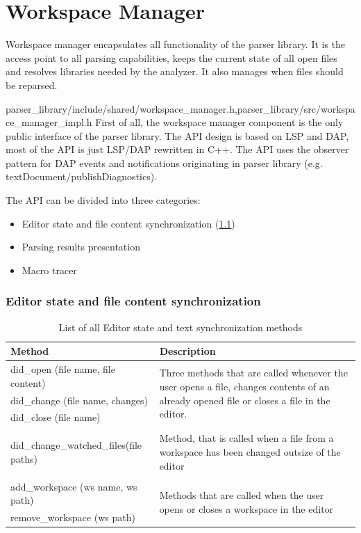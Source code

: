 \chapter{Workspace Manager}
\label{ws_manager}
Workspace manager encapsulates all functionality of the parser library. It is the access point to all parsing capabilities, keeps the current state of all open files and resolves libraries needed by the analyzer. It also manages when files should be reparsed.


{parser\_library/include/shared/workspace\_manager.h,parser\_library/src/workspace\_manager\_impl.h}
First of all, the workspace manager component is the only public interface of the parser library. The API design is based on LSP and DAP, most of the API is just LSP/DAP rewritten in C++. The API uses the observer pattern for DAP events and notifications originating in parser library (e.g. textDocument/publishDiagnostics).

The API can be divided into three categories:
\begin{itemize}
	\item Editor state and file content synchronization (\cref{text_sync_methods})
	\item Parsing results presentation 
	\item Macro tracer
\end{itemize}

\subsection{Editor state and file content synchronization}

\begin{table}
	\centering
	\begin{tabular}{ll}
		
		\toprule
		Method & Description \\ \midrule
		did\_open (file name, file content) & \multirow{3}{8cm}{Three methods that are called whenever the user opens a file, changes contents of an already opened file or closes a file in the editor.} \\
		did\_change (file name, changes)& \\
		did\_close (file name)& \\
		& \\
		\multirow{3}{5cm}{did\_change\_watched\_files(file paths)} &\multirow{3}{8cm}{Method, that is called when a file from a workspace has been changed outsize of the editor} \\
		& \\
		& \\
		& \\
		add\_workspace (ws name, ws path) & \multirow{2}{8cm}{Methods that are called when the user opens or closes a workspace in the editor} \\
		remove\_workspace (ws path) & \\ \bottomrule
	\end{tabular}
	
	\caption{List of all Editor state and text synchronization methods}
	\label{text_sync_methods}
\end{table}

